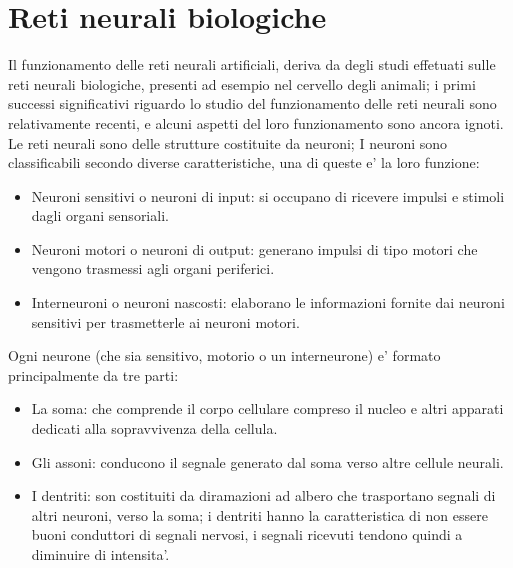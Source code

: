\documentclass[a4paper,10pt]{book}
\begin{document}
\section{Reti neurali biologiche}
Il funzionamento delle reti neurali artificiali, deriva da degli studi effetuati
sulle reti neurali biologiche, presenti ad esempio nel cervello degli animali; 
i primi successi significativi riguardo lo studio 
del funzionamento delle reti neurali sono relativamente recenti, e alcuni aspetti
del loro funzionamento sono ancora ignoti.
Le reti neurali sono delle strutture costituite da neuroni; 
I neuroni sono classificabili secondo diverse caratteristiche, una di queste
e' la loro funzione:
\begin{itemize}
\item Neuroni sensitivi o neuroni di input: si occupano di ricevere impulsi e stimoli 
		dagli organi sensoriali.
\item Neuroni motori o neuroni di output: generano impulsi di tipo motori che vengono
		trasmessi agli organi periferici.
\item Interneuroni o neuroni nascosti: elaborano le informazioni fornite dai neuroni 
		sensitivi per trasmetterle ai neuroni motori.
\end{itemize}

Ogni neurone (che sia sensitivo, motorio o un interneurone) e' formato 
principalmente da tre parti:
\begin{itemize}
\item La soma: che comprende il corpo cellulare compreso il nucleo e altri apparati 
		dedicati alla sopravvivenza della cellula.
 
\item Gli assoni: conducono il segnale generato dal soma verso altre cellule neurali.
 
\item I dentriti: son costituiti da diramazioni ad albero che trasportano segnali di 
		altri neuroni, verso la soma; i dentriti hanno la caratteristica di non essere 
		buoni
		conduttori di segnali nervosi, i segnali ricevuti tendono quindi a diminuire di
		intensita'.
\end{itemize}
\end{document}
